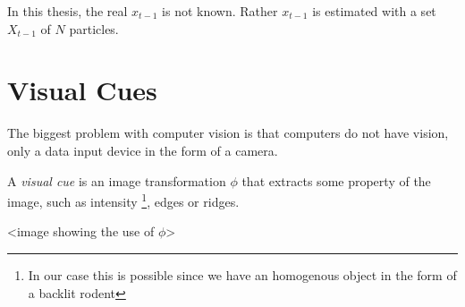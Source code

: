 In this thesis, the real $x_{t-1}$ is not known. Rather $x_{t-1}$ is
estimated with a set $X_{t-1}$ of $N$ particles.

\section{Visual Cues}

The biggest problem with computer vision is that computers do not have
vision, only a data input device in the form of a camera.

A \emph{visual cue} is an image transformation $\phi$ that extracts
some property of the image, such as intensity
\footnote{In our case this is possible since we have an homogenous object
in the form of a backlit rodent}, edges or ridges\cite{Hedvig}.

<image showing the use of $\phi$>

